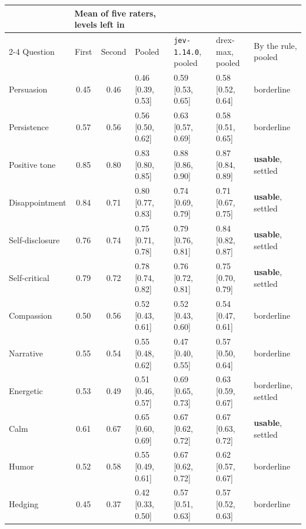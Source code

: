 {\scriptsize\setlength{\tabcolsep}{3.5pt}
\begin{tabular}{@{}l cc l l l l@{}}
\toprule
 & \multicolumn{3}{l}{Mean of five raters, levels left in} & & & \\
\cmidrule(r){2-4}
Question & First & Second & Pooled & \texttt{jev-1.14.0}, pooled & drex-max, pooled & By the rule, pooled \\
\midrule
Persuasion & 0.45 & 0.46 & 0.46 {\scriptsize[0.39, 0.53]} & 0.59 {\scriptsize[0.53, 0.65]} & 0.58 {\scriptsize[0.52, 0.64]} & borderline \\
Persistence & 0.57 & 0.56 & 0.56 {\scriptsize[0.50, 0.62]} & 0.63 {\scriptsize[0.57, 0.69]} & 0.58 {\scriptsize[0.51, 0.65]} & borderline \\
Positive tone & 0.85 & 0.80 & 0.83 {\scriptsize[0.80, 0.85]} & 0.88 {\scriptsize[0.86, 0.90]} & 0.87 {\scriptsize[0.84, 0.89]} & \textbf{usable}, settled \\
Disappointment & 0.84 & 0.71 & 0.80 {\scriptsize[0.77, 0.83]} & 0.74 {\scriptsize[0.69, 0.79]} & 0.71 {\scriptsize[0.67, 0.75]} & \textbf{usable}, settled \\
Self-disclosure & 0.76 & 0.74 & 0.75 {\scriptsize[0.71, 0.78]} & 0.79 {\scriptsize[0.76, 0.81]} & 0.84 {\scriptsize[0.82, 0.87]} & \textbf{usable}, settled \\
Self-critical & 0.79 & 0.72 & 0.78 {\scriptsize[0.74, 0.82]} & 0.76 {\scriptsize[0.72, 0.81]} & 0.75 {\scriptsize[0.70, 0.79]} & \textbf{usable}, settled \\
Compassion & 0.50 & 0.56 & 0.52 {\scriptsize[0.43, 0.61]} & 0.52 {\scriptsize[0.43, 0.60]} & 0.54 {\scriptsize[0.47, 0.61]} & borderline \\
Narrative & 0.55 & 0.54 & 0.55 {\scriptsize[0.48, 0.62]} & 0.47 {\scriptsize[0.40, 0.55]} & 0.57 {\scriptsize[0.50, 0.64]} & borderline \\
Energetic & 0.53 & 0.49 & 0.51 {\scriptsize[0.46, 0.57]} & 0.69 {\scriptsize[0.65, 0.73]} & 0.63 {\scriptsize[0.59, 0.67]} & borderline, settled \\
Calm & 0.61 & 0.67 & 0.65 {\scriptsize[0.60, 0.69]} & 0.67 {\scriptsize[0.62, 0.72]} & 0.67 {\scriptsize[0.63, 0.72]} & \textbf{usable}, settled \\
Humor & 0.52 & 0.58 & 0.55 {\scriptsize[0.49, 0.61]} & 0.67 {\scriptsize[0.62, 0.72]} & 0.62 {\scriptsize[0.57, 0.67]} & borderline \\
Hedging & 0.45 & 0.37 & 0.42 {\scriptsize[0.33, 0.50]} & 0.57 {\scriptsize[0.51, 0.63]} & 0.57 {\scriptsize[0.52, 0.63]} & borderline \\
\bottomrule
\end{tabular}}
